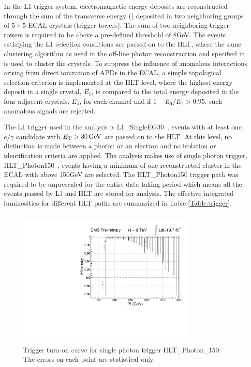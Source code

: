 In the L1 trigger system, electromagnetic energy deposits are reconstructed through the sum of the transverse energy (\et) deposited in two
neighboring groups of $5\times5$ ECAL crystals (trigger towers). The \et sum of two neighboring trigger towers is required to be above a 
pre-defined threshold of 8\unit{GeV}. The events satisfying the L1 selection conditions are passed on to the HLT, where the same clustering algorithm 
as used in the off-line photon reconstruction and specified in \sectn{\ref{Se:photonReco}} is used to cluster the crystals. To suppress the 
influence of anomalous interactions arising from direct ionization of APDs in the ECAL, a simple topological selection criterion is implemented 
at the HLT level, where the highest energy deposit in a single crystal, $E_1$, is compared to the total energy deposited in the four adjacent 
crystals, $E_4$, for each channel and if $1-E_4/E_1>0.95$, such anomalous signals are rejected.

The L1 trigger used in the analysis is L1\_SingleEG30~\cite{Chatrchyan:2008aa,triggerTDR,daqhltTDR}, \ie events with at least one $e/\gamma$ candidate 
with $E_{\mathrm T}>30\mathrm{\,GeV}$ are passed on to the HLT. At this level, no distinction is made between a photon or an electron and no isolation or 
identification criteria are applied. The analysis makes use of single photon trigger, HLT\_Photon150~\cite{Chatrchyan:2008aa,triggerTDR,daqhltTDR}, 
\ie events having a minimum of one reconstructed cluster in the ECAL with \et above 150\unit{GeV} are selected. The HLT\_Photon150 trigger path was 
required to be unprescaled for the entire data taking period which means all the events passed by L1 and HLT are stored for analysis. The effective 
integrated luminosities for different HLT paths are summarized in Table \ref{Table:trigger}. 
\begin{figure}[h!]
\centering
\includegraphics[width=9cm,height=7cm]{ch5/plots/DataMC/TriggerTurnOn_HLT150_v3.pdf}
 \caption{Trigger turn-on curve for single photon trigger HLT\_Photon\_150. The errors on each point are statistical only.}
 \label{fig:HLT150}
\end{figure}

